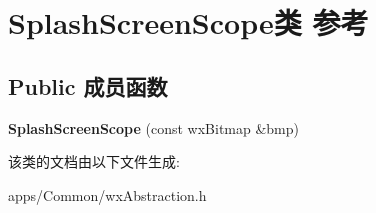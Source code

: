 \hypertarget{class_splash_screen_scope}{\section{Splash\+Screen\+Scope类 参考}
\label{class_splash_screen_scope}
}
\subsection*{Public 成员函数}
\begin{DoxyCompactItemize}
\item 
\hypertarget{class_splash_screen_scope_a678383e9157644ec5cf5b2c67c20d165}{{\bfseries Splash\+Screen\+Scope} (const wx\+Bitmap \&bmp)}\label{class_splash_screen_scope_a678383e9157644ec5cf5b2c67c20d165}

\end{DoxyCompactItemize}


该类的文档由以下文件生成\+:\begin{DoxyCompactItemize}
\item 
apps/\+Common/wx\+Abstraction.\+h\end{DoxyCompactItemize}
